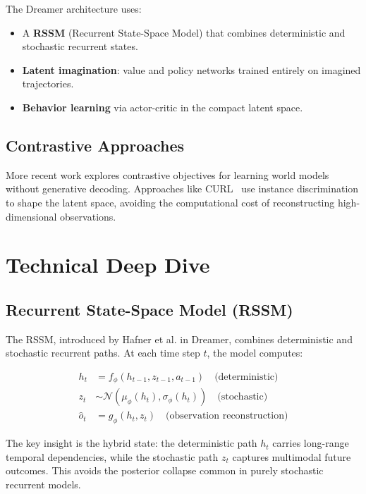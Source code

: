 \documentclass{tufte-handout}
\begin{document}
The Dreamer architecture uses:
\begin{itemize}
    \item A \textbf{RSSM} (Recurrent State-Space Model) that combines deterministic and
          stochastic recurrent states.
    \item \textbf{Latent imagination}: value and policy networks trained entirely on imagined
          trajectories.
    \item \textbf{Behavior learning} via actor-critic in the compact latent space.
\end{itemize}

\subsection{Contrastive Approaches}

More recent work explores contrastive objectives for learning world models without generative
decoding. Approaches like CURL~\nocite{laskin2020} use instance discrimination to shape the
latent space, avoiding the computational cost of reconstructing high-dimensional observations.

\section{Technical Deep Dive}

\subsection{Recurrent State-Space Model (RSSM)}

The RSSM, introduced by Hafner et al. in Dreamer, combines deterministic and stochastic
recurrent paths. At each time step $t$, the model computes:

\begin{align}
    h_t &= f_\phi(h_{t-1}, z_{t-1}, a_{t-1}) \quad \text{(deterministic)} \\
    z_t &\sim \mathcal{N}(\mu_\phi(h_t), \sigma_\phi(h_t)) \quad \text{(stochastic)} \\
    \hat{o}_t &= g_\phi(h_t, z_t) \quad \text{(observation reconstruction)}
\end{align}

The key insight is the hybrid state: the deterministic path $h_t$ carries long-range temporal
dependencies, while the stochastic path $z_t$ captures multimodal future outcomes. This avoids
the posterior collapse common in purely stochastic recurrent models.
\end{document}
